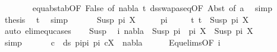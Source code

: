 \begin{isabellebody}
\ \ \ \ \ \ \isamarkupfalse%
\ equ{\isacharunderscore}{\kern0pt}abst{\isacharunderscore}{\kern0pt}ab{\isacharbrackleft}{\kern0pt}OF\ False{\isacharcomma}{\kern0pt}\ of\ nabla\ t{}{\isacharprime}{\kern0pt}{\isacharbrackright}{\kern0pt}\ ds{\isacharunderscore}{\kern0pt}swapas{\isacharunderscore}{\kern0pt}eq{\isacharbrackleft}{\kern0pt}OF\ Abst{\isacharparenleft}{\kern0pt}{}{\isacharparenright}{\kern0pt}{\isacharcomma}{\kern0pt}\ of\ a{\isacharbrackright}{\kern0pt}\ \isamarkupfalse%
\ simp\isanewline
\ \ \ \ \isamarkupfalse%
\ \isamarkupfalse%
\ {\isacharquery}{\kern0pt}thesis\ \isamarkupfalse%
\ t{}\ \isamarkupfalse%
\ simp\isanewline
\ \ \isamarkupfalse%
\isanewline
{}\isamarkupfalse%
\isanewline
\ \ \isamarkupfalse%
\ {\isacharparenleft}{\kern0pt}Susp\ pi\ X{\isacharparenright}{\kern0pt}\isanewline
\ \ \isamarkupfalse%
\ \isamarkupfalse%
\ pi{\isacharprime}{\kern0pt}\isanewline
\ \ \ \ \ t{}{\isacharcolon}{\kern0pt}\ {\isachardoublequoteopen}t{}\ {\isacharequal}{\kern0pt}\ Susp\ pi{\isacharprime}{\kern0pt}\ X{\isachardoublequoteclose}\isanewline
\ \ \ \ \isamarkupfalse%
\ {\isacharparenleft}{\kern0pt}auto\ elim{\isacharcolon}{\kern0pt}equ{\isachardot}{\kern0pt}cases{\isacharparenright}{\kern0pt}\isanewline
\ \ \isamarkupfalse%
\ Susp\ \isamarkupfalse%
\ i{\isacharcolon}{\kern0pt}\ {\isachardoublequoteopen}nabla\ {\isasymturnstile}\ Susp\ {\isacharparenleft}{\kern0pt}pi{}\ {\isacharat}{\kern0pt}\ pi{\isacharparenright}{\kern0pt}\ X\ {\isasymapprox}\ Susp\ pi{\isacharprime}{\kern0pt}\ X{\isachardoublequoteclose}\ \isanewline
\ \ \ \ \isamarkupfalse%
\ simp\isanewline
\ \ \isamarkupfalse%
\ \isamarkupfalse%
\ {\isachardoublequoteopen}{\isasymforall}\ c\ {\isasymin}\ ds\ {\isacharparenleft}{\kern0pt}pi{}{\isacharat}{\kern0pt}pi{\isacharparenright}{\kern0pt}\ pi{\isacharprime}{\kern0pt}{\isachardot}{\kern0pt}\ {\isacharparenleft}{\kern0pt}c{\isacharcomma}{\kern0pt}X{\isacharparenright}{\kern0pt}\ {\isasymin}\ nabla{\isachardoublequoteclose}\isanewline
\ \ \ \ \isamarkupfalse%
\ Equ{\isacharunderscore}{\kern0pt}elims{\isacharparenleft}{\kern0pt}{}{\isacharparenright}{\kern0pt}{\isacharbrackleft}{\kern0pt}OF\ i{\isacharbrackright}{\kern0pt}\ \isamarkupfalse%

\end{isabellebody}
